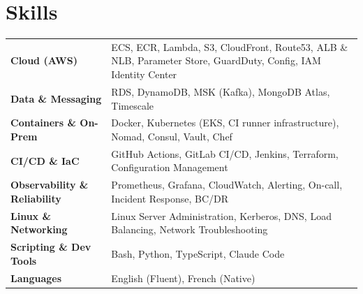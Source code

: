 
\section{Skills}
\renewcommand{\arraystretch}{1.25}
\begin{tabularx}{\linewidth}{@{}l X@{}}
\textbf{Cloud (AWS)} &  \small{ECS, ECR, Lambda, S3, CloudFront, Route53, ALB \& NLB, Parameter Store, GuardDuty, Config, IAM Identity Center}\\
\textbf{Data \& Messaging} &  \small{RDS, DynamoDB, MSK (Kafka), MongoDB Atlas, Timescale}\\
\textbf{Containers \& On-Prem} &  \small{Docker, Kubernetes (EKS, CI runner infrastructure), Nomad, Consul, Vault, Chef}\\
\textbf{CI/CD \& IaC}  &  \small{GitHub Actions, GitLab CI/CD, Jenkins, Terraform, Configuration Management}\\
\textbf{Observability \& Reliability} &  \small{Prometheus, Grafana, CloudWatch, Alerting, On-call, Incident Response, BC/DR}\\
\textbf{Linux \& Networking} &  \small{Linux Server Administration, Kerberos, DNS, Load Balancing, Network Troubleshooting}\\
\textbf{Scripting \& Dev Tools}  &  \small{Bash, Python, TypeScript, Claude Code}\\
\textbf{Languages} &  \small{English (Fluent), French (Native)}\\
\end{tabularx}
\renewcommand{\arraystretch}{1}
